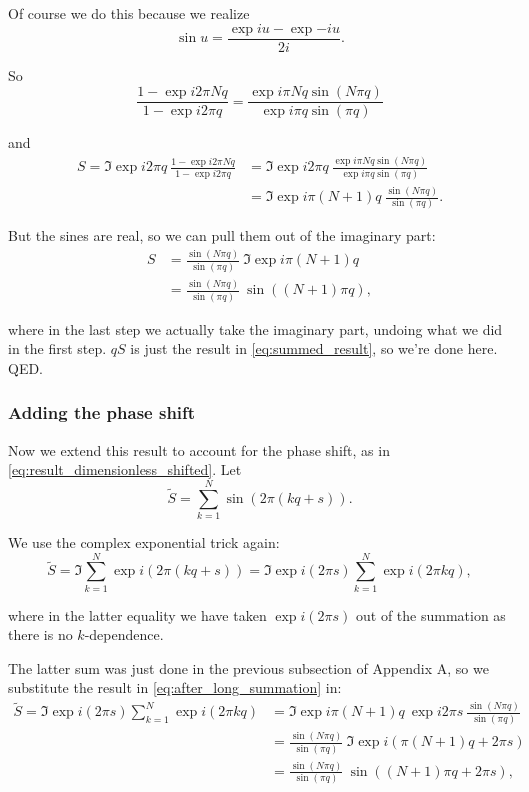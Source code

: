 \documentclass[11pt]{article}
\begin{document}
Of course we do this because we realize
$$
\sin u = \frac{\exp{iu} - \exp{-iu}}{2i}.
$$

So 
$$
\frac{1 - \exp{i 2\pi Nq}}{1 - \exp{i 2 \pi q}} = \frac{\exp{i\pi Nq}\sin(N\pi q)}{\exp{i\pi q}\sin(\pi q)}
$$

and
\begin{align}
S = \Im{\exp{i 2\pi q} \: \frac{1 - \exp{i 2\pi Nq}}{1 - \exp{i 2\pi q}}} 
&= \Im{\exp{i 2\pi q} \: \frac{\exp{i\pi Nq}\sin(N\pi q)}{\exp{i\pi q}\sin(\pi q)}} \nonumber \\[0.5em]
&= \Im{\exp{i \pi (N+1)q} \: \frac{\sin(N\pi q)}{\sin(\pi q)}} \label{eq:after_long_summation}.
\end{align}

But the sines are real, so we can pull them out of the imaginary part:
\begin{align}
S &= \frac{\sin(N\pi q)}{\sin(\pi q)} \: \Im{\exp{i \pi (N+1)q}} \\[0.5em]
&= \frac{\sin(N\pi q)}{\sin(\pi q)} \: \sin((N+1)\pi q),
\end{align}

where in the last step we actually take the imaginary part, undoing what we did in the first step. $qS$ is just the result in \eqref{eq:summed_result}, so we're done here. QED.

\subsubsection*{Adding the phase shift}
\label{subsubsec:sumwith_phase_shift}
Now we extend this result to account for the phase shift, as in \eqref{eq:result_dimensionless_shifted}. Let
\begin{equation}
\tilde{S} = \sum_{k=1}^{N} \sin(2\pi (kq + s)).
\end{equation}

We use the complex exponential trick again:
\begin{equation}
\tilde{S} = \Im{\sum_{k=1}^{N} \exp{i(2\pi (kq + s))}} = \Im{\exp{i(2\pi s)}\sum_{k=1}^{N} \exp{i(2\pi kq)}} \label{eq:step1_shifted},
\end{equation}

where in the latter equality we have taken $\exp{i(2\pi s)}$ out of the summation as there is no $k$-dependence. \\

\par The latter sum was just done in the previous subsection of Appendix A, so we substitute the result in \eqref{eq:after_long_summation} in:
\begin{align}
\tilde{S} = \Im{\exp{i(2\pi s)}\sum_{k=1}^{N} \exp{i(2\pi kq)}} &= \Im{\exp{i \pi (N+1)q} \: \exp{i 2\pi s} \: \frac{\sin(N\pi q)}{\sin(\pi q)}} \nonumber \\[0.5em]
&= \frac{\sin(N\pi q)}{\sin(\pi q)} \: \Im{\exp{i (\pi (N+1)q + 2\pi s)}} \\[0.5em]
&= \frac{\sin(N\pi q)}{\sin(\pi q)} \: \sin ((N+1)\pi q + 2\pi s), \label{eq:step2_shifted}
\end{align}
\end{document}

